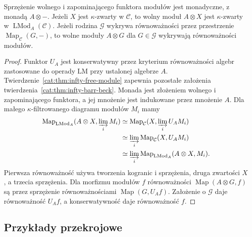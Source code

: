 \begin{wniosek}\label{cat:cor:infty-module-monadic}
Sprzężenie wolnego i zapominającego funktora modułów jest monadyczne, z monadą $A\otimes-$. Jeżeli $X$ jest $\kappa$-zwarty w $\mathcal C$, to wolny moduł $A\otimes X$ jest $\kappa$-zwarty w $\operatorname{LMod}_A(\mathcal C)$. Jeżeli rodzina $\mathcal G$ wykrywa równoważności przez przestrzenie $\operatorname{Map}_{\mathcal C}(G,-)$, to wolne moduły $A\otimes G$ dla $G\in\mathcal G$ wykrywają równoważności modułów.
\end{wniosek}
\begin{proof}
Funktor $U_A$ jest konserwatywny przez kryterium równoważności algebr zastosowane do operady $\mathrm{LM}$ przy ustalonej algebrze $A$. Twierdzenie~\ref{cat:thm:infty-free-module} zapewnia pozostałe założenia twierdzenia~\ref{cat:thm:infty-barr-beck}. Monada jest złożeniem wolnego i zapominającego funktora, a jej mnożenie jest indukowane przez mnożenie $A$. Dla małego $\kappa$-filtrowanego diagramu modułów $M_i$ mamy
\[
\begin{aligned}
 \operatorname{Map}_{\operatorname{LMod}_A}(A\otimes X,\varinjlim_i M_i)
 &\simeq \operatorname{Map}_{\mathcal C}(X,\varinjlim_i U_AM_i)\\
 &\simeq\varinjlim_i\operatorname{Map}_{\mathcal C}(X,U_AM_i)\\
 &\simeq\varinjlim_i\operatorname{Map}_{\operatorname{LMod}_A}(A\otimes X,M_i).
\end{aligned}
\]
Pierwsza równoważność używa tworzenia kogranic i sprzężenia, druga zwartości $X$, a trzecia sprzężenia. Dla morfizmu modułów $f$ równoważności $\operatorname{Map}(A\otimes G,f)$ są przez sprzężenie równoważnościami $\operatorname{Map}(G,U_Af)$. Założenie o $\mathcal G$ daje równoważność $U_Af$, a konserwatywność daje równoważność $f$.
\end{proof}

\subsection{Przykłady przekrojowe}

